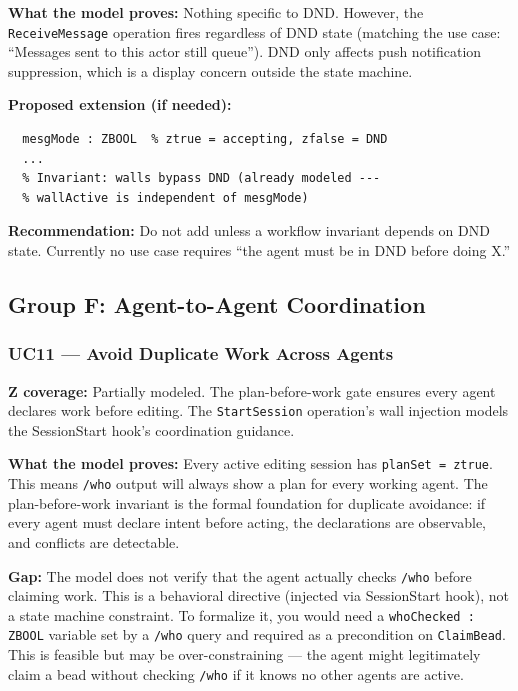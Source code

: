 \documentclass[a4paper,10pt,fleqn]{article}
\begin{document}
\textbf{What the model proves:} Nothing specific to DND. However, the
\texttt{ReceiveMessage} operation fires regardless of DND state (matching
the use case: ``Messages sent to this actor still queue''). DND only
affects push notification suppression, which is a display concern outside
the state machine.

\textbf{Proposed extension (if needed):}

\begin{verbatim}
  mesgMode : ZBOOL  % ztrue = accepting, zfalse = DND
  ...
  % Invariant: walls bypass DND (already modeled ---
  % wallActive is independent of mesgMode)
\end{verbatim}

\textbf{Recommendation:} Do not add unless a workflow invariant depends
on DND state. Currently no use case requires ``the agent must be in
DND before doing X.''

\subsection{Group F: Agent-to-Agent Coordination}

\subsubsection{UC11 --- Avoid Duplicate Work Across Agents}

\textbf{Z coverage:} Partially modeled. The plan-before-work gate
ensures every agent declares work before editing. The
\texttt{StartSession} operation's wall injection models the SessionStart
hook's coordination guidance.

\textbf{What the model proves:} Every active editing session has
\texttt{planSet = ztrue}. This means \texttt{/who} output will always
show a plan for every working agent. The plan-before-work invariant is
the formal foundation for duplicate avoidance: if every agent must
declare intent before acting, the declarations are observable, and
conflicts are detectable.

\textbf{Gap:} The model does not verify that the agent actually checks
\texttt{/who} before claiming work. This is a behavioral directive
(injected via SessionStart hook), not a state machine constraint. To
formalize it, you would need a \texttt{whoChecked : ZBOOL} variable
set by a \texttt{/who} query and required as a precondition on
\texttt{ClaimBead}. This is feasible but may be over-constraining ---
the agent might legitimately claim a bead without checking \texttt{/who}
if it knows no other agents are active.
\end{document}
